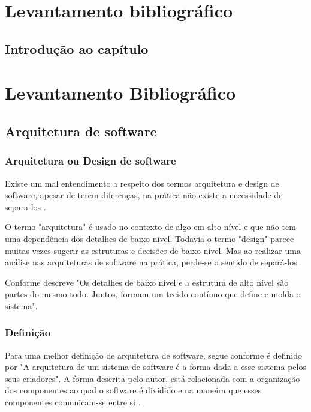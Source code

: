 \chapter{Levantamento bibliográfico}
\section{Introdução ao capítulo}
    \par 

\chapter{Levantamento Bibliográfico}
\section{Arquitetura de software}
    
    \subsection{Arquitetura ou Design de software}
    
        \par Existe um mal entendimento a respeito dos termos arquitetura e design de software, apesar de terem diferenças, na prática não existe a necessidade de separa-los \cite{livro:martin:cleanarch}.
        
        \par O termo "arquitetura"\hspace{0.1cm} é usado no contexto de algo em alto nível e que não tem uma dependência dos detalhes de baixo nível. Todavia o termo "design"\hspace{0.1cm} parece muitas vezes sugerir as estruturas e decisões de baixo nível. Mas ao realizar uma análise nas arquiteturas de software na prática, perde-se o sentido de separá-los \cite{livro:martin:cleanarch}.
    
        \par Conforme descreve  "Os detalhes de baixo nível e a estrutura de alto nível são partes do mesmo todo. Juntos, formam um tecido contínuo que define e molda o sistema".
        
        
    \subsection{Definição}
    
        \par Para uma melhor definição de arquitetura de software, segue conforme é definido por  "A arquitetura de um sistema de software é a forma dada a esse sistema pelos seus criadores". A forma descrita pelo autor, está relacionada com a organização dos componentes ao qual o software é dividido e na maneira que esses componentes comunicam-se entre si \cite{livro:martin:cleanarch}.
        
